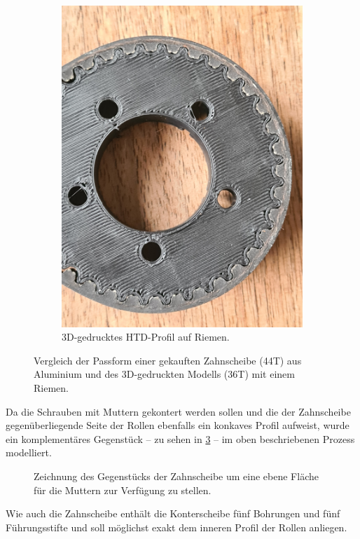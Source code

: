 \begin{figure}[h]
\begin{subfigure}{.49\textwidth}
				\includegraphics[width=\textwidth]{Footage/Pictures/Printed-HTD_tooth_fit.jpg}
				\caption{3D-gedrucktes HTD-Profil auf Riemen.}%
				\label{subfig:printed HTD}
			\end{subfigure}
			\caption{Vergleich der Passform einer gekauften Zahnscheibe (44T) aus Aluminium und des 3D-gedruckten Modells (36T) mit einem Riemen.}%
			\label{fig:HTD profiles comparison}
		\end{figure}\par\medskip
		Da die Schrauben mit Muttern gekontert werden sollen und die der Zahnscheibe gegenüberliegende Seite der Rollen ebenfalls ein konkaves Profil aufweist, wurde ein komplementäres Gegenstück -- zu sehen in \cref{fig:orangatang kegel flat face} -- im oben beschriebenen Prozess modelliert.
		\begin{figure}[h]
			\centering
			
			\caption[Zeichnung des Gegenstücks der Zahnscheibe]{Zeichnung des Gegenstücks der Zahnscheibe um eine ebene Fläche für die Muttern zur Verfügung zu stellen.}%
			\label{fig:orangatang kegel flat face}
		\end{figure}
		Wie auch die Zahnscheibe enthält die Konterscheibe fünf Bohrungen und fünf Führungsstifte und soll möglichst exakt dem inneren Profil der Rollen anliegen.
		
